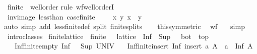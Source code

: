 \begin{isabellebody}
\endisatagproof
{\isafoldproof}%
%
\isadelimproof
%
\endisadelimproof
\isanewline
\isanewline
{}\isamarkupfalse%
\isanewline
\isanewline
{}\isamarkupfalse%
\ finite{\isacharunderscore}{\kern0pt}{}\ {\isacharcolon}{\kern0pt}{\isacharcolon}{\kern0pt}\ wellorder\isanewline
%
\isadelimproof
%
\endisadelimproof
%
\isatagproof
{}\isamarkupfalse%
{\isacharparenleft}{\kern0pt}rule\ wf{\isacharunderscore}{\kern0pt}wellorderI{\isacharparenright}{\kern0pt}\isanewline
\ \ \isamarkupfalse%
\ {\isachardoublequoteopen}inv{\isacharunderscore}{\kern0pt}image\ less{\isacharunderscore}{\kern0pt}than\ {\isacharparenleft}{\kern0pt}case{\isacharunderscore}{\kern0pt}finite{\isacharunderscore}{\kern0pt}{}\ {}\ {}\ {}{\isacharparenright}{\kern0pt}\ {\isacharequal}{\kern0pt}\ {\isacharbraceleft}{\kern0pt}{\isacharparenleft}{\kern0pt}x{\isacharcomma}{\kern0pt}\ y{\isacharparenright}{\kern0pt}{\isachardot}{\kern0pt}\ x\ {\isacharless}{\kern0pt}\ y{\isacharbraceright}{\kern0pt}{\isachardoublequoteclose}\isanewline
\ \ \ \ \isamarkupfalse%
{\isacharparenleft}{\kern0pt}auto\ simp\ add{\isacharcolon}{\kern0pt}\ less{\isacharunderscore}{\kern0pt}finite{\isacharunderscore}{\kern0pt}{}{\isacharunderscore}{\kern0pt}def\ split{\isacharcolon}{\kern0pt}\ finite{\isacharunderscore}{\kern0pt}{}{\isachardot}{\kern0pt}splits{\isacharparenright}{\kern0pt}\isanewline
\ \ \isamarkupfalse%
\ this{\isacharbrackleft}{\kern0pt}symmetric{\isacharbrackright}{\kern0pt}\ \isamarkupfalse%
\ {\isachardoublequoteopen}wf\ {\isasymdots}{\isachardoublequoteclose}\ \isamarkupfalse%
\ simp\isanewline
{}\isamarkupfalse%
\ intro{\isacharunderscore}{\kern0pt}classes%
\endisatagproof
{\isafoldproof}%
%
\isadelimproof
\isanewline
%
\endisadelimproof
\isanewline
{}\isamarkupfalse%
\ finite{\isacharunderscore}{\kern0pt}lattice\ {\isacharequal}{\kern0pt}\ finite\ {\isacharplus}{\kern0pt}\ \ lattice\ {\isacharplus}{\kern0pt}\ Inf\ {\isacharplus}{\kern0pt}\ Sup\ \ {\isacharplus}{\kern0pt}\ bot\ {\isacharplus}{\kern0pt}\ top\ {\isacharplus}{\kern0pt}\isanewline
\ \ \ Inf{\isacharunderscore}{\kern0pt}finite{\isacharunderscore}{\kern0pt}empty{\isacharcolon}{\kern0pt}\ {\isachardoublequoteopen}Inf\ {\isacharbraceleft}{\kern0pt}{\isacharbraceright}{\kern0pt}\ {\isacharequal}{\kern0pt}\ Sup\ UNIV{\isachardoublequoteclose}\isanewline
\ \ \ Inf{\isacharunderscore}{\kern0pt}finite{\isacharunderscore}{\kern0pt}insert{\isacharcolon}{\kern0pt}\ {\isachardoublequoteopen}Inf\ {\isacharparenleft}{\kern0pt}insert\ a\ A{\isacharparenright}{\kern0pt}\ {\isacharequal}{\kern0pt}\ a\ {\isasymsqinter}\ Inf\ A{\isachardoublequoteclose}\isanewline

\end{isabellebody}
